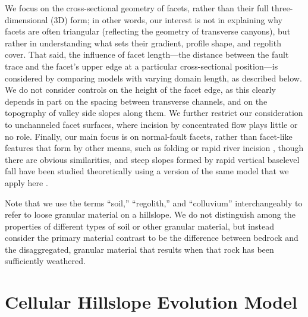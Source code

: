 We focus on the cross-sectional geometry of facets, rather than their full three-dimensional (3D) form; in other words, our interest is not in explaining why facets are often triangular (reflecting the geometry of transverse canyons), but rather in understanding what sets their gradient, profile shape, and regolith cover. That said, the influence of facet length---the distance between the fault trace and the facet's upper edge at a particular cross-sectional position---is considered by comparing models with varying domain length, as described below. We do not consider controls on the height of the facet edge, as this clearly depends in part on the spacing between transverse channels, and on the topography of valley side slopes along them. We further restrict our consideration to unchanneled facet surfaces, where incision by concentrated flow plays little or no role. Finally, our main focus is on normal-fault facets, rather than facet-like features that  form by other means, such as folding or rapid river incision \citep[e.g.,][]{cotton1950tectonic}, though there are obvious similarities, and steep slopes formed by rapid vertical baselevel fall have been studied theoretically using a version of the same model that we apply here \citep{tucker2018lattice}.

Note that we use the terms ``soil,'' ``regolith,'' and ``colluvium'' interchangeably to refer to loose granular material on a hillslope. We do not distinguish among the properties of different types of soil or other granular material, but instead consider the primary material contrast to be the difference between bedrock and the disaggregated, granular material that results when that rock has been sufficiently weathered.


\section{Cellular Hillslope Evolution Model}

